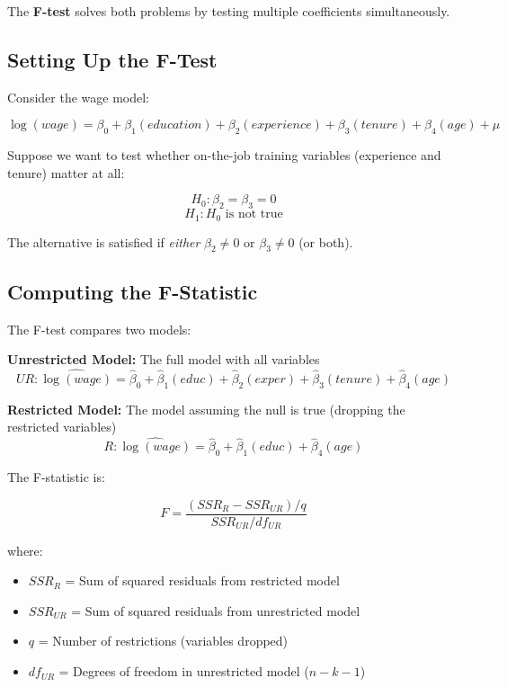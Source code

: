 \documentclass[
  letterpaper,
  DIV=11,
  numbers=noendperiod]{scrreprt}
\providecommand{\tightlist}{%
  \setlength{\itemsep}{0pt}\setlength{\parskip}{0pt}}
\begin{document}
The \textbf{F-test} solves both problems by testing multiple
coefficients simultaneously.

\subsection{Setting Up the F-Test}\label{setting-up-the-f-test}

Consider the wage model:

\[\log(wage) = \beta_0 + \beta_1(education) + \beta_2(experience) + \beta_3(tenure) + \beta_4(age) + \mu\]

Suppose we want to test whether on-the-job training variables
(experience and tenure) matter at all:

\[H_0: \beta_2 = \beta_3 = 0\] \[H_1: H_0 \text{ is not true}\]

The alternative is satisfied if \emph{either} \(\beta_2 \neq 0\) or
\(\beta_3 \neq 0\) (or both).

\subsection{Computing the F-Statistic}\label{computing-the-f-statistic}

The F-test compares two models:

\textbf{Unrestricted Model:} The full model with all variables
\[UR: \widehat{\log(wage)} = \hat{\beta}_0 + \hat{\beta}_1(educ) + \hat{\beta}_2(exper) + \hat{\beta}_3(tenure) + \hat{\beta}_4(age)\]

\textbf{Restricted Model:} The model assuming the null is true (dropping
the restricted variables)
\[R: \widehat{\log(wage)} = \hat{\beta}_0 + \hat{\beta}_1(educ) + \hat{\beta}_4(age)\]

The F-statistic is:

\[F = \frac{(SSR_R - SSR_{UR})/q}{SSR_{UR}/df_{UR}}\]

where:

\begin{itemize}
\tightlist
\item
  \(SSR_R\) = Sum of squared residuals from restricted model
\item
  \(SSR_{UR}\) = Sum of squared residuals from unrestricted model
\item
  \(q\) = Number of restrictions (variables dropped)
\item
  \(df_{UR}\) = Degrees of freedom in unrestricted model (\(n - k - 1\))
\end{itemize}
\end{document}
